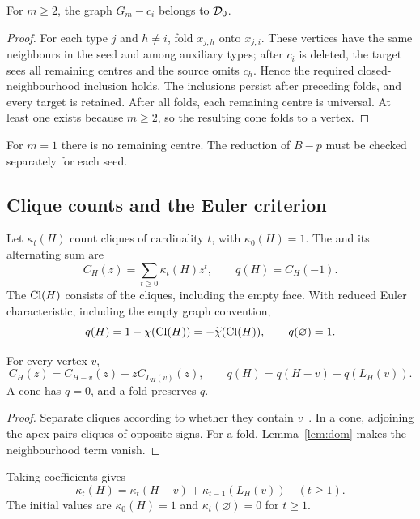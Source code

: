 \begin{lemma}\label{lem:remainder}
For $m\geq2$, the graph $G_m-c_i$ belongs to $\mathcal D_0$.
\end{lemma}
\begin{proof}
For each type $j$ and $h\ne i$, fold $x_{j,h}$ onto $x_{j,i}$. These
vertices have the same neighbours in the seed and among auxiliary types;
after $c_i$ is deleted, the target sees all remaining centres and the source
omits $c_h$. Hence the required closed-neighbourhood inclusion holds.
The inclusions persist after preceding folds, and every target is retained.
After all folds, each remaining centre is universal. At least one exists
because $m\geq2$, so the resulting cone folds to a vertex.
\end{proof}
For $m=1$ there is no remaining centre. The reduction of $B-p$ must be
checked separately for each seed.

\subsection{Clique counts and the Euler criterion}
Let $\kappa_t(H)$ count cliques of cardinality $t$, with $\kappa_0(H)=1$.
The  and its alternating sum are
\[
 C_H(z)=\sum_{t\geq0}\kappa_t(H)z^t,\qquad q(H)=C_H(-1).
\]
The  $\operatorname{Cl}(H)$ consists of the cliques, including the empty
face. With reduced Euler characteristic, including the empty graph convention,
\begin{equation}\label{eq:euler}
 q(H)=1-\chi(\operatorname{Cl}(H))=-\widetilde\chi(\operatorname{Cl}(H)),\qquad q(\varnothing)=1.
\end{equation}
\begin{lemma}\label{lem:qrec}
For every vertex $v$,
\[
 C_H(z)=C_{H-v}(z)+zC_{L_H(v)}(z),\qquad
 q(H)=q(H-v)-q(L_H(v)).
\]
A cone has $q=0$, and a fold preserves $q$.
\end{lemma}
\begin{proof}
Separate cliques according to whether they contain $v$~\cite{HL1994}.
In a cone, adjoining the apex pairs cliques of opposite signs. For a fold,
Lemma~\ref{lem:dom} makes the neighbourhood term vanish.
\end{proof}
Taking coefficients gives
\begin{equation}\label{eq:clique-coefficients}
 \kappa_t(H)=\kappa_t(H-v)+\kappa_{t-1}(L_H(v))\quad(t\geq1).
\end{equation}
The initial values are $\kappa_0(H)=1$ and $\kappa_t(\varnothing)=0$ for $t\geq1$.

